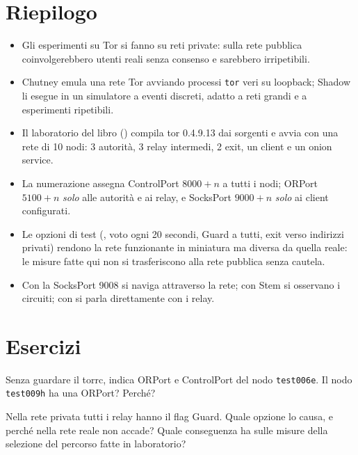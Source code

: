 \section*{Riepilogo}
\begin{itemize}
  \item Gli esperimenti su Tor si fanno su reti private: sulla rete pubblica coinvolgerebbero utenti reali senza consenso e sarebbero irripetibili.
  \item Chutney emula una rete Tor avviando processi \texttt{tor} veri su loopback; Shadow li esegue in un simulatore a eventi discreti, adatto a reti grandi e a esperimenti ripetibili.
  \item Il laboratorio del libro () compila tor 0.4.9.13 dai sorgenti e avvia con  una rete di 10 nodi: 3 autorità, 3 relay intermedi, 2 exit, un client e un onion service.
  \item La numerazione assegna ControlPort $8000+n$ a tutti i nodi; ORPort $5100+n$ \emph{solo} alle autorità e ai relay, e SocksPort $9000+n$ \emph{solo} ai client configurati.
  \item Le opzioni di test (, voto ogni 20 secondi, Guard a tutti, exit verso indirizzi privati) rendono la rete funzionante in miniatura ma diversa da quella reale: le misure fatte qui non si trasferiscono alla rete pubblica senza cautela.
  \item Con la SocksPort 9008 si naviga attraverso la rete; con Stem si osservano i circuiti; con  si parla direttamente con i relay.
\end{itemize}

\section*{Esercizi}

\begin{esercizio}[1]\label{es:19-porte}
Senza guardare il torrc, indica ORPort e ControlPort del nodo \texttt{test006e}. Il nodo \texttt{test009h} ha una ORPort? Perché?
\end{esercizio}

\begin{esercizio}[1]\label{es:19-guard}
Nella rete privata tutti i relay hanno il flag Guard. Quale opzione lo causa, e perché nella rete reale non accade? Quale conseguenza ha sulle misure della selezione del percorso fatte in laboratorio?
\end{esercizio}

